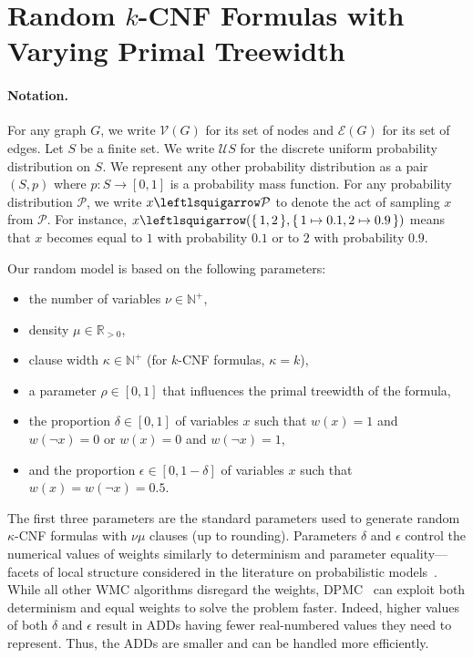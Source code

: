 \documentclass[runningheads]{llncs}
\begin{document}
\section{Random $k$-CNF Formulas with Varying Primal Treewidth}\label{sec:model}

\paragraph{Notation.}
For any graph $G$, we write $\mathcal{V}(G)$ for its set of nodes and
$\mathcal{E}(G)$ for its set of edges. Let $S$ be a finite set. We write
$\mathcal{U}S$ for the discrete uniform probability distribution on $S$. We
represent any other probability distribution as a pair $(S, p)$ where
$p\colon S \to [0, 1]$ is a probability mass function. For any probability
distribution $\mathcal{P}$, we write $x \leftlsquigarrow \mathcal{P}$ to denote
the act of sampling $x$ from $\mathcal{P}$. For instance,
$x \leftlsquigarrow (\{\, 1, 2 \,\}, \{\, 1 \mapsto 0.1, 2 \mapsto 0.9 \,\})$
means that $x$ becomes equal to $1$ with probability $0.1$ or to $2$ with
probability $0.9$.

Our random model is based on the following parameters:
\begin{itemize}
\item the number of variables $\nu \in \mathbb{N}^+$,
\item density $\mu \in \mathbb{R}_{>0}$,
\item clause width $\kappa \in \mathbb{N}^+$ (for $k$-CNF formulas, $\kappa =
  k$),
\item a parameter $\rho \in [0, 1]$ that influences the primal treewidth of
  the formula,
\item the proportion $\delta \in [0, 1]$ of variables $x$ such that $w(x) = 1$
  and $w(\neg x) = 0$ or $w(x) = 0$ and $w(\neg x) = 1$,
\item and the proportion $\epsilon \in [0, 1-\delta]$ of variables $x$ such that
  $w(x) = w(\neg x) = 0.5$.
\end{itemize}
The first three parameters are the standard parameters used to generate random
$\kappa$-CNF formulas with $\nu\mu$ clauses (up to rounding). Parameters
$\delta$ and $\epsilon$ control the numerical values of weights similarly to
determinism and parameter equality---facets of local structure considered in the
literature on probabilistic models~\cite{DBLP:journals/ai/VlasselaerMBR16}.
While all other \textsf{WMC} algorithms disregard the weights,
\textsc{DPMC}~\cite{DBLP:conf/cp/DudekPV20} can exploit both determinism and
equal weights to solve the problem faster. Indeed, higher values of both
$\delta$ and $\epsilon$ result in ADDs having fewer real-numbered values they
need to represent. Thus, the ADDs are smaller and can be handled more
efficiently.
\end{document}
